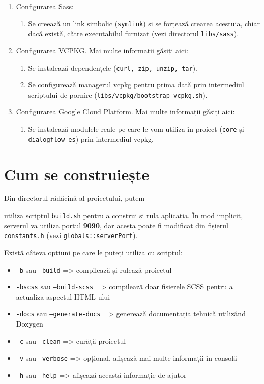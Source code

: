 \begin{enumerate}
\begin{enumerate}
    \end{enumerate}
  \item Configurarea Sass:
    \begin{enumerate}
      \item Se creează un link simbolic (\texttt{symlink}) și se forțează crearea acestuia, chiar dacă există, către executabilul furnizat (vezi directorul \texttt{libs/sass}).
    \end{enumerate}
  \item Configurarea VCPKG. Mai multe informații găsiți \href{https://github.com/Microsoft/vcpkg}{aici}:
    \begin{enumerate}
      \item Se instalează dependențele (\texttt{curl, zip, unzip, tar}).
      \item Se configurează managerul vcpkg pentru prima dată prin intermediul scriptului de pornire (\texttt{libs/vcpkg/bootstrap-vcpkg.sh}).
    \end{enumerate}
  \item Configurarea Google Cloud Platform. Mai multe informații găsiți \href{https://github.com/googleapis/google-cloud-cpp/tree/main/google/cloud/dialogflow_es/quickstart}{aici}:
    \begin{enumerate}
      \item Se instalează modulele reale pe care le vom utiliza în proiect (\texttt{core} și \texttt{dialogflow-es}) prin intermediul vcpkg.
    \end{enumerate}
\end{enumerate}

\section{Cum se construiește}
Din directorul rădăcină al proiectului, putem

 utiliza scriptul \texttt{build.sh} pentru a construi și rula aplicația. În mod implicit, serverul va utiliza portul \textbf{9090}, dar acesta poate fi modificat din fișierul \texttt{constants.h} (vezi \texttt{globals::serverPort}).

Există câteva opțiuni pe care le puteți utiliza cu scriptul:
\begin{itemize}
  \item \texttt{-b} sau \texttt{--build} => compilează și rulează proiectul
  \item \texttt{-bscss} sau \texttt{--build-scss} => compilează doar fișierele SCSS pentru a actualiza aspectul HTML-ului
  \item \texttt{-docs} sau \texttt{--generate-docs} => generează documentația tehnică utilizând Doxygen
  \item \texttt{-c} sau \texttt{--clean} => curăță proiectul
  \item \texttt{-v} sau \texttt{--verbose} => opțional, afișează mai multe informații în consolă
  \item \texttt{-h} sau \texttt{--help} => afișează această informație de ajutor
\end{itemize}

